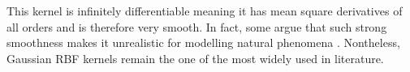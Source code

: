 



This kernel is infinitely differentiable meaning it has mean square derivatives of all orders and is therefore very smooth. In fact, some argue that such strong smoothness makes it unrealistic for modelling natural phenomena \cite{RasmussenCarlEdward2006Gpfm,SteinMichaelL1999IoSD}. Nontheless, Gaussian RBF kernels remain the one of the most widely used in literature.